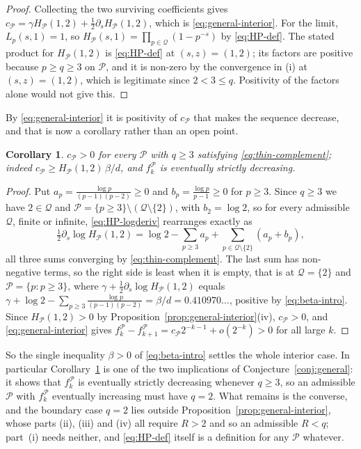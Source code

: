 \documentclass[11pt]{amsart}
\theoremstyle{plain}
\newtheorem{corollary}[theorem]{Corollary}
\theoremstyle{definition}
\begin{document}
\begin{proof}
Collecting the two surviving coefficients gives
$c_{\mathcal P}=\gamma H_{\mathcal P}(1,2)
 +\tfrac12\partial_sH_{\mathcal P}(1,2)$, which is
\eqref{eq:general-interior}. For the limit, $L_p(s,1)=1$, so
$H_{\mathcal P}(s,1)=\prod_{p\in\mathcal Q}(1-p^{-s})$ by \eqref{eq:HP-def}.
The stated product for $H_{\mathcal P}(1,2)$ is \eqref{eq:HP-def} at
$(s,z)=(1,2)$; its factors are positive because $p\geq q\geq3$ on
$\mathcal P$, and it is non-zero by the convergence in (i) at $(s,z)=(1,2)$,
which is legitimate since $2<3\leq q$. Positivity of the factors alone would
not give this.
\end{proof}

By \eqref{eq:general-interior} it is positivity of $c_{\mathcal P}$ that
makes the sequence decrease, and that is now a corollary rather than an open
point.

\begin{corollary}\label{cor:general-positivity}
$c_{\mathcal P}>0$ for every $\mathcal P$ with $q\geq3$
satisfying \eqref{eq:thin-complement}; indeed
$c_{\mathcal P}\geq H_{\mathcal P}(1,2)\,\beta/d$, and
$f_k^{\mathcal P}$ is eventually strictly decreasing.
\end{corollary}

\begin{proof}
Put $a_p=\frac{\log p}{(p-1)(p-2)}\geq0$ and $b_p=\frac{\log p}{p-1}\geq0$ for
$p\geq3$. Since $q\geq3$ we have $2\in\mathcal Q$ and
$\mathcal P=\{p\geq3\}\setminus(\mathcal Q\setminus\{2\})$, with $b_2=\log2$,
so for every admissible $\mathcal Q$, finite or infinite,
\eqref{eq:HP-logderiv} rearranges exactly as
\[
  \tfrac12\partial_s\log H_{\mathcal P}(1,2)
   =\log2-\sum_{p\geq3}a_p
    +\sum_{p\in\mathcal Q\setminus\{2\}}(a_p+b_p),
\]
all three sums converging by \eqref{eq:thin-complement}. The last sum has
non-negative terms, so the right side is least when it is empty, that is at
$\mathcal Q=\{2\}$ and $\mathcal P=\{p:p\geq3\}$, where
$\gamma+\tfrac12\partial_s\log H_{\mathcal P}(1,2)$ equals
$\gamma+\log2-\sum_{p\geq3}\frac{\log p}{(p-1)(p-2)}=\beta/d=0.410970\ldots$,
positive by \eqref{eq:beta-intro}. Since $H_{\mathcal P}(1,2)>0$ by
Proposition~\ref{prop:general-interior}(iv), $c_{\mathcal P}>0$, and
\eqref{eq:general-interior} gives
$f_k^{\mathcal P}-f_{k+1}^{\mathcal P}=c_{\mathcal P}2^{-k-1}+o(2^{-k})>0$ for
all large $k$.
\end{proof}

So the single inequality $\beta>0$ of \eqref{eq:beta-intro} settles the whole
interior case. In particular Corollary~\ref{cor:general-positivity} is one of
the two implications of Conjecture~\ref{conj:general}: it shows that
$f_k^{\mathcal P}$ is eventually strictly decreasing whenever $q\geq3$, so an
admissible $\mathcal P$ with $f_k^{\mathcal P}$ eventually increasing must have
$q=2$. What remains is the converse, and the boundary case $q=2$ lies outside
Proposition~\ref{prop:general-interior}, whose parts (ii), (iii) and (iv) all
require $R>2$ and so an admissible $R<q$; part~(i) needs neither, and
\eqref{eq:HP-def} itself is a definition for any $\mathcal P$ whatever.
\end{document}
